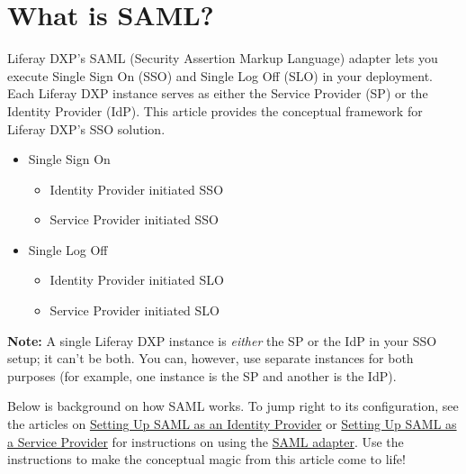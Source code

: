 \chapter{What is SAML?}\label{what-is-saml}

Liferay DXP's SAML (Security Assertion Markup Language) adapter lets you
execute Single Sign On (SSO) and Single Log Off (SLO) in your
deployment. Each Liferay DXP instance serves as either the Service
Provider (SP) or the Identity Provider (IdP). This article provides the
conceptual framework for Liferay DXP's SSO solution.

\begin{itemize}
\tightlist
\item
  Single Sign On

  \begin{itemize}
  \tightlist
  \item
    Identity Provider initiated SSO
  \item
    Service Provider initiated SSO
  \end{itemize}
\item
  Single Log Off

  \begin{itemize}
  \tightlist
  \item
    Identity Provider initiated SLO
  \item
    Service Provider initiated SLO
  \end{itemize}
\end{itemize}

\noindent\hrulefill

\textbf{Note:} A single Liferay DXP instance is \emph{either} the SP or
the IdP in your SSO setup; it can't be both. You can, however, use
separate instances for both purposes (for example, one instance is the
SP and another is the IdP).

\noindent\hrulefill

Below is background on how SAML works. To jump right to its
configuration, see the articles on
\href{/docs/7-0/deploy/-/knowledge_base/d/setting-up-liferay-as-a-saml-identity-provider}{Setting
Up SAML as an Identity Provider} or
\href{/docs/7-0/deploy/-/knowledge_base/d/setting-up-liferay-as-a-saml-service-provider}{Setting
Up SAML as a Service Provider} for instructions on using the
\href{https://web.liferay.com/marketplace/-/mp/application/15188711}{SAML
adapter}. Use the instructions to make the conceptual magic from this
article come to life!

\noindent\hrulefill

